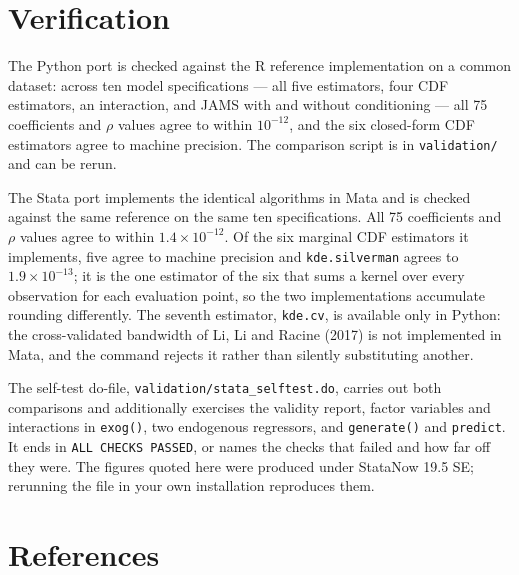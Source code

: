 \documentclass[11pt]{article}
\begin{document}
\section{Verification}

The Python port is checked against the R reference implementation on a common
dataset: across ten model specifications --- all five estimators, four CDF
estimators, an interaction, and JAMS with and without conditioning --- all 75
coefficients and $\rho$ values agree to within $10^{-12}$, and the six
closed-form CDF estimators agree to machine precision. The comparison script
is in \texttt{validation/} and can be rerun.

The Stata port implements the identical algorithms in Mata and is checked
against the same reference on the same ten specifications. All 75 coefficients
and $\rho$ values agree to within $1.4 \times 10^{-12}$. Of the six marginal
CDF estimators it implements, five agree to machine precision and
\texttt{kde.silverman} agrees to $1.9 \times 10^{-13}$; it is the one estimator
of the six that sums a kernel over every observation for each evaluation point,
so the two implementations accumulate rounding differently. The seventh
estimator, \texttt{kde.cv}, is available only in Python: the cross-validated
bandwidth of Li, Li and Racine (2017) is not implemented in Mata, and the
command rejects it rather than silently substituting another.

The self-test do-file, \texttt{validation/stata\_selftest.do}, carries out both
comparisons and additionally exercises the validity report, factor variables
and interactions in \texttt{exog()}, two endogenous regressors, and
\texttt{generate()} and \texttt{predict}. It ends in \texttt{ALL CHECKS PASSED},
or names the checks that failed and how far off they were. The figures quoted
here were produced under StataNow 19.5 SE; rerunning the file in your own
installation reproduces them.

\section{References}
\label{sec:refs}
\end{document}

